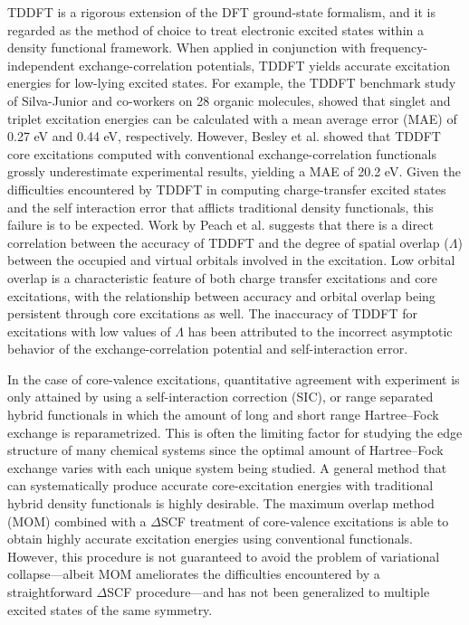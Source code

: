 \documentclass[12pt]{article}
\begin{document}
TDDFT is a rigorous extension of the DFT ground-state formalism,\cite{runge_density-functional_1984} and it is regarded as the method of choice to treat electronic excited states within a density functional framework.
 When applied in conjunction with frequency-independent exchange-correlation potentials, TDDFT yields accurate excitation energies for low-lying excited states. For example, the TDDFT benchmark study of Silva-Junior and co-workers\cite{silva-junior_benchmarks_2008} on 28 organic molecules, showed that singlet and triplet excitation energies can be calculated with a mean average error (MAE) of 0.27 eV and 0.44 eV, respectively. However, Besley et al.\cite{besley_self-consistent-field_2009} showed that TDDFT core excitations computed with conventional exchange-correlation functionals grossly underestimate experimental results, yielding a MAE of 20.2 eV.  Given the difficulties encountered by TDDFT in computing charge-transfer excited states\cite{dreuw_failure_2004} and the self interaction error that afflicts traditional density functionals, this failure is to be expected.
Work by Peach et al. \cite{peach_excitation_2008} suggests that there is a direct correlation between the accuracy of TDDFT and the degree of spatial overlap ($\Lambda$) between the occupied and virtual orbitals involved in the excitation. Low orbital overlap is a characteristic feature of both charge transfer excitations and core excitations, with the relationship between accuracy and orbital overlap being persistent through core excitations as well. \cite{besley_time-dependent_2009}
The inaccuracy of TDDFT for excitations with low values of $\Lambda$ has been attributed to the incorrect asymptotic behavior of the exchange-correlation potential and self-interaction error.\cite{peach_excitation_2008}

In the case of core-valence excitations, quantitative agreement with experiment is only attained by using a self-interaction correction (SIC),\cite{tu_core_2007} or range separated hybrid functionals in which the amount of long and short range Hartree--Fock exchange is reparametrized.\cite{besley_time-dependent_2009, nakata_time-dependent_2006} This is often the limiting factor for studying the edge structure of many chemical systems since the optimal amount of Hartree--Fock exchange varies with each unique system being studied.\cite{capano_role_2013,besley_time-dependent_2007,besley_time-dependent_2010} A general method that can systematically produce accurate core-excitation energies with traditional hybrid density functionals is highly desirable. The maximum overlap method (MOM) \cite{besley_self-consistent-field_2009} combined with a $\Delta$SCF treatment of core-valence excitations is able to obtain highly accurate excitation energies using conventional functionals. However, this procedure is not guaranteed to avoid the problem of variational collapse---albeit MOM ameliorates the difficulties encountered by a straightforward $\Delta$SCF procedure---and has not been generalized to multiple excited states of the same symmetry.
\end{document}
